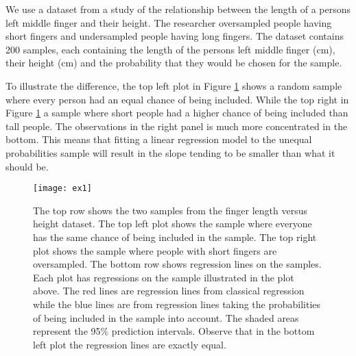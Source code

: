 \documentclass{article}
\begin{document}
\begin{example}

We use a dataset from a study of the relationship between the length of a persons left middle finger and their height. 
The researcher oversampled people having short fingers and undersampled people
having long fingers.
The dataset contains 200 samples, each containing the length of the persons left middle finger (cm), their height (cm) and the probability that they would be chosen for the sample.

To illustrate the difference, the top left plot in Figure \ref{fig:ex1} shows a random sample where every
person had an equal chance of being included. While the top right in Figure \ref{fig:ex1} a sample
where short people had a higher chance of being included than tall people. The
observations in the right panel is much more concentrated in the bottom.
This means that fitting a linear regression model to the unequal probabilities
sample will result in the slope tending to be smaller than what it should be.

\begin{figure}
  \centering
  
  \texttt{[image: ex1]}

  \caption{The top row shows the two samples from the finger length versus
    height dataset. The top left plot shows the sample where everyone has the
    same chance of being included in the sample.
    The top right plot shows the sample where people with short fingers are
    oversampled. The bottom row shows regression lines on the samples. Each plot has
    regressions on the sample illustrated in the plot above. The red lines are
    regression lines from classical regression while the blue lines are from
    regression lines taking the probabilities of being included in the sample
    into account. The shaded areas represent the 95\% prediction intervals.
    Observe that in the bottom left plot the regression lines are exactly equal.}

  \label{fig:ex1}



\end{figure}
\end{example}
\end{document}
